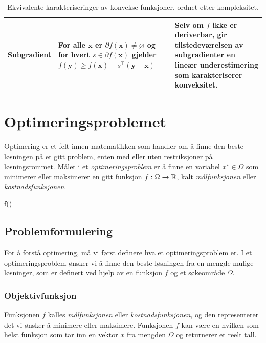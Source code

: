 \begin{table}[H]
\begin{tabularx}{\textwidth}{|>{\raggedright\arraybackslash}X|>{\raggedright\arraybackslash}X|>{\raggedright\arraybackslash}X|}
		\hline
		Subgradient                 &
		For alle \( \symbf{x} \) er \( \partial f(\symbf{x}) \neq \varnothing \) og for hvert \( s \in \partial f(\symbf{x}) \) gjelder
		\( f(\symbf{y}) \ge f(\symbf{x}) + s^\top (\symbf{y}-\symbf{x}) \)
		                            & Selv om \( f \) ikke er deriverbar, gir tilstedeværelsen av subgradienter en lineær underestimering som karakteriserer konveksitet.
		\\
		\hline
	\end{tabularx}
	\caption{Ekvivalente karakteriseringer av konvekse funksjoner, ordnet etter kompleksitet.}
	\label{tab:convex_equivalence}
\end{table}

\chapter{Optimeringsproblemet}
\label{chap:optimization_problem}

Optimering er et felt innen matematikken som handler om å finne den beste løsningen på et gitt problem, enten med eller uten restriksjoner på løsningsrommet.
Målet i et \emph{optimeringsproblem} er å finne en variabel \(x^\star \in \Omega\) som minimerer eller maksimerer en gitt funksjon \(f: \Omega \to \mathbb{R}\),
kalt \emph{mål\-funksjonen} eller \emph{kostnads\-funksjonen}.

\begin{mini!}{}{f()}{}{}
\label{eq:opt_problem}
\end{mini!}

\section{Problemformulering}
\label{sec:problem_formulation}
For å forstå optimering, må vi først definere hva et optimeringsproblem er.
I et optimeringsproblem ønsker vi å finne den beste løsningen fra en mengde mulige løsninger, som er definert ved hjelp av en funksjon \(f\) og et søkeområde \(\Omega\).

\subsection{Objektivfunksjon}
Funksjonen \(f\) kalles \emph{mål\-funksjonen} eller \emph{kostnads\-funksjonen}, og den representerer det vi ønsker å minimere eller maksimere.
Funksjonen \(f\) kan være en hvilken som helst funksjon som tar inn en vektor \(x\) fra mengden \(\Omega\) og returnerer et reelt tall.

